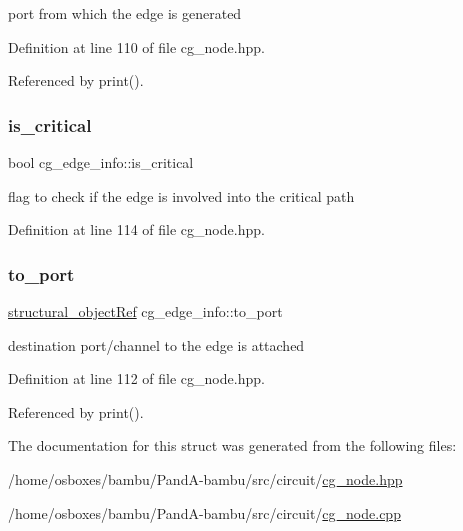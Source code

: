 port from which the edge is generated 



Definition at line 110 of file cg\+\_\+node.\+hpp.



Referenced by print().

\mbox{\label{structcg__edge__info_ae1d1e8a9ae7fbbca1bd609ddadabdc7f}} 
\subsubsection{\texorpdfstring{is\+\_\+critical}{is\_critical}}
{\footnotesize\ttfamily bool cg\+\_\+edge\+\_\+info\+::is\+\_\+critical}



flag to check if the edge is involved into the critical path 



Definition at line 114 of file cg\+\_\+node.\+hpp.

\mbox{\label{structcg__edge__info_a26058bf2df2f23bbee962f60bb44a40f}} 
\subsubsection{\texorpdfstring{to\+\_\+port}{to\_port}}
{\footnotesize\ttfamily \hyperlink{structural__objects_8hpp_a8ea5f8cc50ab8f4c31e2751074ff60b2}{structural\+\_\+object\+Ref} cg\+\_\+edge\+\_\+info\+::to\+\_\+port}



destination port/channel to the edge is attached 



Definition at line 112 of file cg\+\_\+node.\+hpp.



Referenced by print().



The documentation for this struct was generated from the following files\+:\begin{DoxyCompactItemize}
\item 
/home/osboxes/bambu/\+Pand\+A-\/bambu/src/circuit/\hyperlink{cg__node_8hpp}{cg\+\_\+node.\+hpp}\item 
/home/osboxes/bambu/\+Pand\+A-\/bambu/src/circuit/\hyperlink{cg__node_8cpp}{cg\+\_\+node.\+cpp}\end{DoxyCompactItemize}
